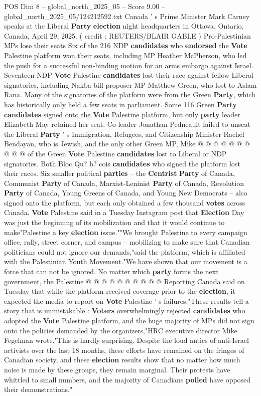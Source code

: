 \begin{textsample}{POS Dim 8 – global\_north\_2025\_05 – Score 9.00 – global\_north\_2025\_05/124212592.txt}
Canada ' s Prime Minister Mark Carney speaks at the Liberal \textbf{Party} \textbf{election} night headquarters in Ottawa, Ontario, Canada, April 29, 2025. ( credit : REUTERS/BLAIR GABLE ) Pro-Palestinian MPs lose their seats Six of the 216 NDP \textbf{candidates} who \textbf{endorsed} the \textbf{Vote} Palestine platform won their seats, including MP Heather McPherson, who led the push for a successful non-binding motion for an arms embargo against Israel.
Seventeen NDP \textbf{Vote} Palestine \textbf{candidates} lost their race against fellow Liberal signatories, including Nakba bill proposer MP Matthew Green, who lost to Aslam Rana.
Many of the signatories of the platform were from the Green \textbf{Party}, which has historically only held a few seats in parliament.
Some 116 Green \textbf{Party} \textbf{candidates} signed onto the \textbf{Vote} Palestine platform, but only \textbf{party} leader Elizabeth May retained her seat.
Co-leader Jonathan Pedneault failed to unseat the Liberal \textbf{Party} ' s Immigration, Refugees, and Citizenship Minister Rachel Bendayan, who is Jewish, and the only other Green MP, Mike @ @ @ @ @ @ @ @ @ @ of the Green \textbf{Vote} Palestine \textbf{candidates} lost to Liberal or NDP signatories.
Both Bloc Qu? b? cois \textbf{candidates} who signed the platform lost their races.
Six smaller political \textbf{parties} -- the \textbf{Centrist} \textbf{Party} of Canada, Communist \textbf{Party} of Canada, Marxist-Leninist \textbf{Party} of Canada, Revolution \textbf{Party} of Canada, Young Greens of Canada, and Young New Democrats -- also signed onto the platform, but each only obtained a few thousand \textbf{votes} across Canada. \textbf{Vote} Palestine said in a Tuesday Instagram post that \textbf{Election} Day was just the beginning of its mobilization and that it would continue to make"Palestine a key \textbf{election} issue.""We brought Palestine to every campaign office, rally, street corner, and campus -- mobilizing to make sure that Canadian politicians could not ignore our demands,"said the platform, which is affiliated with the Palestinian Youth Movement."We have shown that our movement is a force that can not be ignored.
No matter which \textbf{party} forms the next government, the Palestine @ @ @ @ @ @ @ @ @ @ Reporting Canada said on Tuesday that while the platform received coverage prior to the \textbf{election}, it expected the media to report on \textbf{Vote} Palestine ' s failures."These results tell a story that is unmistakable : \textbf{Voters} overwhelmingly rejected \textbf{candidates} who adopted the \textbf{Vote} Palestine platform, and the huge majority of MPs did not sign onto the policies demanded by the organizers,"HRC executive director Mike Fegelman wrote."This is hardly surprising.
Despite the loud antics of anti-Israel activists over the last 18 months, these efforts have remained on the fringes of Canadian society, and these \textbf{election} results show that no matter how much noise is made by these groups, they remain marginal.
Their protests have whittled to small numbers, and the majority of Canadians \textbf{polled} have opposed their demonstrations."


\end{textsample}

